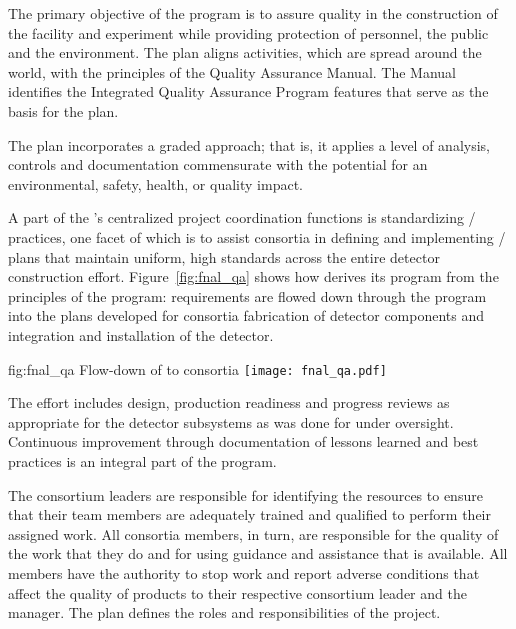 The primary objective of the   program is
to assure quality in the construction of the  facility and
 experiment while providing protection of
 personnel, the public and the environment. The
 plan aligns   activities, which
are spread around the world, with the principles of the \fnal Quality
Assurance Manual. The Manual identifies the \fnal Integrated Quality
Assurance Program features that serve as the basis for the
  plan.

The   plan incorporates 
a graded approach; that is, it applies a level of analysis,
controls and documentation commensurate with the potential for an
environmental, safety, health, or quality impact.

A part of the 's centralized project
coordination functions is
standardizing / practices, one facet
of which is to assist consortia in defining and implementing
/ plans that maintain uniform, high
standards across the entire detector construction
effort. Figure~\ref{fig:fnal_qa} shows how  
derives its  program from the principles of the \fnal {} program:
requirements are flowed down through the 
 program into the  plans developed for consortia fabrication of
detector components and integration and installation of the detector.

\begin{dunefigure}[\fnal QA]{fig:fnal_qa}
  {Flow-down of \fnal {} to consortia}
  \texttt{[image: fnal\_qa.pdf]}
\end{dunefigure}

The  effort includes design, production readiness and
progress reviews as appropriate for the  detector
subsystems as was done for  under 
oversight. Continuous improvement through documentation of lessons learned and best practices is
an integral part of the program. 


The  consortium leaders are responsible for identifying the
resources to ensure that their team members are adequately trained and
qualified to perform their assigned work. 
All consortia members, in turn, are responsible for the quality of the work that
they do and for using guidance and assistance that is available. All members 
have the authority to stop work and report adverse conditions that
affect the quality of  products to their respective
 consortium leader and the 
 manager. The  plan
defines the  roles and responsibilities of the 
project.


